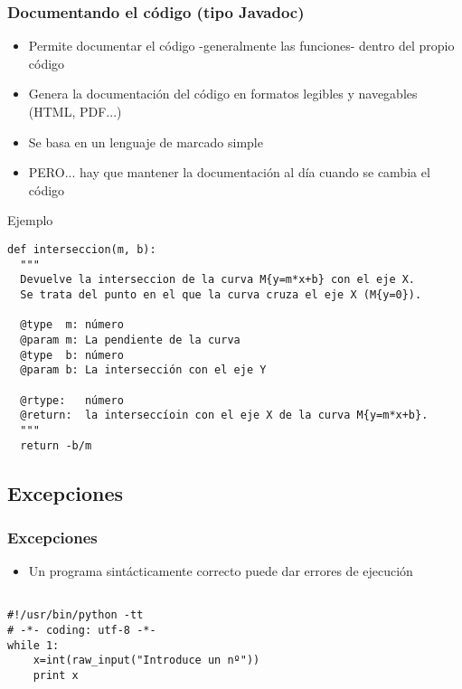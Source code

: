 \documentclass[ucs]{beamer}
\begin{document}
\begin{frame}
\frametitle{Documentando el código (tipo Javadoc)}

\begin{small}
\begin{itemize}
\item Permite documentar el código -generalmente las funciones- dentro del propio código
\item Genera la documentación del código en formatos legibles y navegables
(HTML, PDF...)
\item Se basa en un lenguaje de marcado simple
\item PERO... hay que mantener la documentación al día cuando se cambia
el código
\end{itemize}
\end{small}
\end{frame}

\begin{frame}[fragile]
Ejemplo

\begin{small}
\begin{verbatim}
def interseccion(m, b):
  """
  Devuelve la interseccion de la curva M{y=m*x+b} con el eje X. 
  Se trata del punto en el que la curva cruza el eje X (M{y=0}).

  @type  m: número
  @param m: La pendiente de la curva
  @type  b: número
  @param b: La intersección con el eje Y

  @rtype:   número
  @return:  la interseccíoin con el eje X de la curva M{y=m*x+b}.
  """
  return -b/m
\end{verbatim}
\end{small}
  
\end{frame}

\subsection{Excepciones}

\begin{frame}[fragile]
\frametitle{Excepciones}
\begin{itemize}
\item Un programa sintácticamente correcto puede dar errores de ejecución
\end{itemize}

  \begin{scriptsize}
\begin{verbatim}

#!/usr/bin/python -tt
# -*- coding: utf-8 -*-
while 1:
    x=int(raw_input("Introduce un nº"))
    print x

\end{verbatim}
  \end{scriptsize}

\end{frame}
\end{document}
